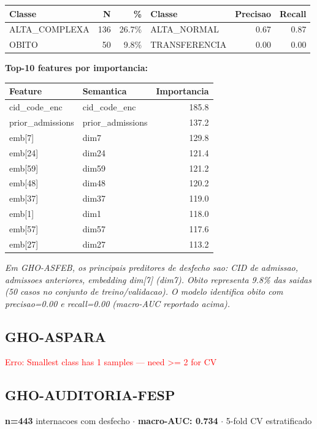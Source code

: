 \documentclass[11pt,a4paper]{article}
\begin{document}
\begin{tabular}{lrr|lrr}
\toprule
Classe & N & \% & Classe & Precisao & Recall \\
\midrule
ALTA\_COMPLEXA & 136 & 26.7\% & ALTA\_NORMAL & 0.67 & 0.87 \\
OBITO & 50 & 9.8\% & TRANSFERENCIA & 0.00 & 0.00 \\
\bottomrule
\end{tabular}

\vspace{4pt}\noindent\textbf{Top-10 features por importancia:}

\begin{tabular}{llr}
\toprule
Feature & Semantica & Importancia \\
\midrule
cid\_code\_enc & cid\_code\_enc & 185.8 \\
prior\_admissions & prior\_admissions & 137.2 \\
emb[7] & dim7 & 129.8 \\
emb[24] & dim24 & 121.4 \\
emb[59] & dim59 & 121.2 \\
emb[48] & dim48 & 120.2 \\
emb[37] & dim37 & 119.0 \\
emb[1] & dim1 & 118.0 \\
emb[57] & dim57 & 117.6 \\
emb[27] & dim27 & 113.2 \\
\bottomrule
\end{tabular}

\vspace{4pt}\noindent\textit{Em GHO-ASFEB, os principais preditores de desfecho sao: CID de admissao, admissoes anteriores, embedding dim[7] (dim7). Obito representa 9.8\% das saidas (50 casos no conjunto de treino/validacao). O modelo identifica obito com precisao=0.00 e recall=0.00 (macro-AUC reportado acima).}

\subsection{GHO-ASPARA}
\textcolor{red}{Erro: Smallest class has 1 samples — need >= 2 for CV}

\subsection{GHO-AUDITORIA-FESP}
\textbf{n=443} internacoes com desfecho $\cdot$ \textbf{macro-AUC: 0.734} $\cdot$ 5-fold CV estratificado
\end{document}
